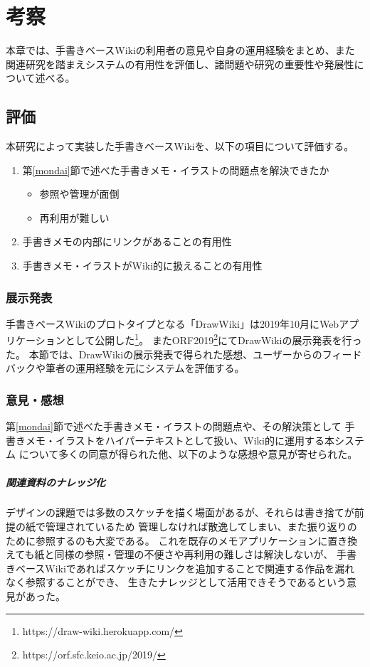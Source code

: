 \chapter{考察}
\label{chap:kosatsu}

本章では、手書きベースWikiの利用者の意見や自身の運用経験をまとめ、また関連研究を踏まえシステムの有用性を評価し、諸問題や研究の重要性や発展性について述べる。

\newpage

\section{評価}
本研究によって実装した手書きベースWikiを、以下の項目について評価する。

\begin{enumerate}
    \item 第\ref{mondai}節で述べた手書きメモ・イラストの問題点を解決できたか
    \begin{itemize}
              \item 参照や管理が面倒
              \item 再利用が難しい
    \end{itemize}
    \item 手書きメモの内部にリンクがあることの有用性
    \item 手書きメモ・イラストがWiki的に扱えることの有用性
\end{enumerate}

\subsection{展示発表}
手書きベースWikiのプロトタイプとなる「DrawWiki」は2019年10月にWebアプリケーションとして公開した\footnote{ \textsf{https://draw-wiki.herokuapp.com/} }。
またORF2019\footnote{ \textsf{https://orf.sfc.keio.ac.jp/2019/} }にてDrawWikiの展示発表を行った。
本節では、DrawWikiの展示発表で得られた感想、ユーザーからのフィードバックや筆者の運用経験を元にシステムを評価する。

\subsection{意見・感想}

第\ref{mondai}節で述べた手書きメモ・イラストの問題点や、その解決策として
手書きメモ・イラストをハイパーテキストとして扱い、Wiki的に運用する本システム
について多くの同意が得られた他、以下のような感想や意見が寄せられた。

\paragraph*{関連資料のナレッジ化}
デザインの課題では多数のスケッチを描く場面があるが、それらは書き捨てが前提の紙で管理されているため
管理しなければ散逸してしまい、また振り返りのために参照するのも大変である。
これを既存のメモアプリケーションに置き換えても紙と同様の参照・管理の不便さや再利用の難しさは解決しないが、
手書きベースWikiであればスケッチにリンクを追加することで関連する作品を漏れなく参照することができ、
生きたナレッジとして活用できそうであるという意見があった。

